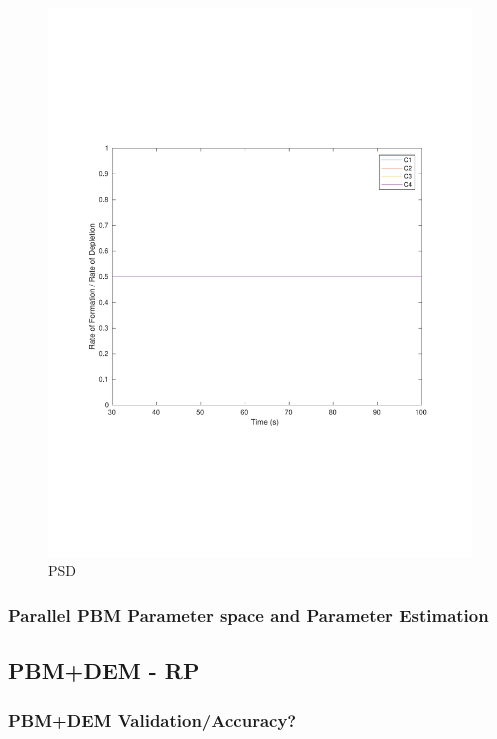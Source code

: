 \documentclass[preprint,11pt,authoryear]{elsarticle}
\begin{document}
\begin{figure}[H]
	\centering
	\includegraphics[scale=0.5]{rslts_PBM_2mm_validation.pdf}
	\caption{PSD}
	\label{fig:pbm_model_validation_psd}
\end{figure}


\subsubsection{Parallel PBM Parameter space and Parameter Estimation}


\subsection{PBM+DEM - RP} 
\subsubsection{PBM+DEM Validation/Accuracy?}
%	    
\end{document}
